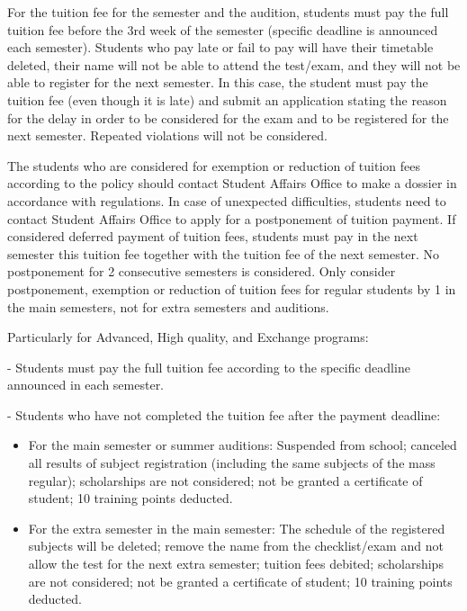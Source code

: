 For the tuition fee for the semester and the audition, students must pay the full tuition fee before the 3rd week of the semester (specific deadline is announced each semester). Students who pay late or fail to pay will have their timetable deleted, their name will not be able to attend the test/exam, and they will not be able to register for the next semester. In this case, the student must pay the tuition fee (even though it is late) and submit an application stating the reason for the delay in order to be considered for the exam and to be registered for the next semester. Repeated violations will not be considered.

The students who are considered for exemption or reduction of tuition fees according to the policy should contact Student Affairs Office to make a dossier in accordance with regulations. In case of unexpected difficulties, students need to contact Student Affairs Office to apply for a postponement of tuition payment. If considered deferred payment of tuition fees, students must pay in the next semester this tuition fee together with the tuition fee of the next semester. No postponement for 2 consecutive semesters is considered. Only consider postponement, exemption or reduction of tuition fees for regular students by 1 in the main semesters, not for extra semesters and auditions.

Particularly for Advanced, High quality, and Exchange programs:

- Students must pay the full tuition fee according to the specific deadline announced in each semester.

- Students who have not completed the tuition fee after the payment deadline:
\begin{itemize}
	\item For the main semester or summer auditions: Suspended from school; canceled all results of subject registration (including the same subjects of the mass regular); scholarships are not considered; not be granted a certificate of student; 10 training points deducted.
	
	\item For the extra semester in the main semester: The schedule of the registered subjects will be deleted; remove the name from the checklist/exam and not allow the test for the next extra semester; tuition fees debited; scholarships are not considered; not be granted a certificate of student; 10 training points deducted.

\end{itemize}

